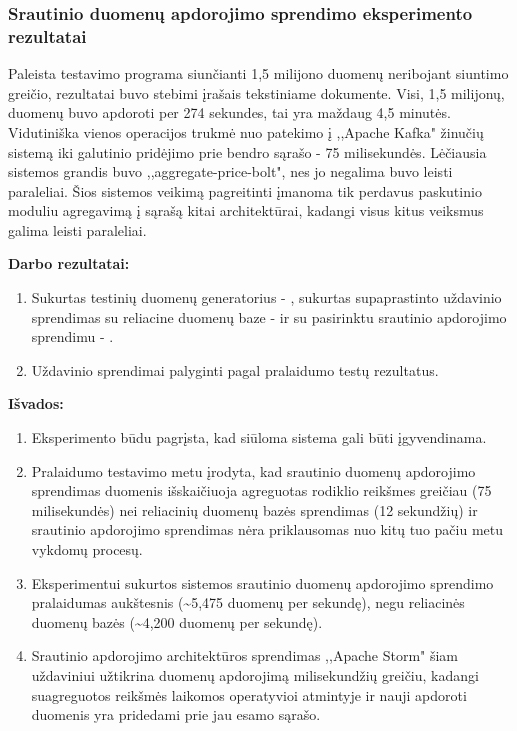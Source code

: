 \documentclass{VUMIFPSkursinis}
\begin{document}
\subsubsection{Srautinio duomenų apdorojimo sprendimo eksperimento rezultatai}
Paleista testavimo programa siunčianti 1,5 milijono duomenų neribojant siuntimo greičio, rezultatai buvo stebimi įrašais tekstiniame dokumente.
Visi, 1,5 milijonų, duomenų buvo apdoroti per 274 sekundes, tai yra maždaug 4,5 minutės. Vidutiniška vienos operacijos trukmė nuo 
patekimo į ,,Apache Kafka" žinučių sistemą iki galutinio pridėjimo prie bendro sąrašo - 75 milisekundės.
Lėčiausia sistemos grandis buvo ,,aggregate-price-bolt", nes jo negalima buvo leisti paraleliai. Šios sistemos veikimą pagreitinti 
įmanoma tik perdavus paskutinio moduliu agregavimą į sąrašą kitai architektūrai, kadangi visus kitus veiksmus galima leisti paraleliai.


\textbf{Darbo rezultatai:}
\vspace{1 mm}

    \begin{enumerate}
        \item Sukurtas testinių duomenų generatorius - , 
        sukurtas supaprastinto uždavinio sprendimas su reliacine duomenų baze - 
         ir su pasirinktu srautinio apdorojimo sprendimu - .
        \item Uždavinio sprendimai palyginti pagal pralaidumo testų rezultatus.
    \end{enumerate}
    \vspace{1 mm}

\textbf{Išvados:}
\vspace{1 mm}

    \begin{enumerate}
    \item Eksperimento būdu pagrįsta, kad siūloma sistema gali būti įgyvendinama.
    \item Pralaidumo testavimo metu įrodyta, kad srautinio duomenų apdorojimo sprendimas duomenis išskaičiuoja 
    agreguotas rodiklio reikšmes greičiau (75 milisekundės) nei reliacinių duomenų bazės sprendimas (12 sekundžių) 
    ir srautinio apdorojimo sprendimas nėra priklausomas nuo kitų tuo pačiu metu vykdomų procesų.
    \item Eksperimentui sukurtos sistemos srautinio duomenų apdorojimo sprendimo pralaidumas aukštesnis 
    (\textasciitilde5,475 duomenų per sekundę), negu reliacinės duomenų bazės (\textasciitilde 4,200 duomenų per sekundę). 
    \item Srautinio apdorojimo architektūros sprendimas ,,Apache Storm" šiam uždaviniui užtikrina duomenų apdorojimą milisekundžių greičiu,
    kadangi suagreguotos reikšmės laikomos operatyvioi atmintyje ir nauji apdoroti duomenis yra pridedami prie jau esamo sąrašo.

    \end{enumerate}

\printbibliography[heading=bibintoc] 
\end{document}
